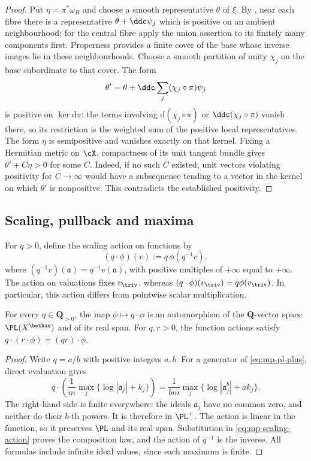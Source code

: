 \begin{proof}
Put $\eta=\pi^*\omega_B$ and choose a smooth representative
$\theta$ of $\xi$.  By \cite[Proposition~3.3(i)--(ii)]{DP04}, near
each fibre there is a representative $\theta+\ddc\psi_j$ which is positive on an
ambient neighbourhood; for the central fibre apply the union assertion
to its finitely many components first.  Properness provides a finite
cover of the base whose inverse images lie in these neighbourhoods.
Choose a smooth partition of unity $\chi_j$ on the base subordinate to
that cover.  The form
\[
 \theta'=\theta+\ddc\sum_j(\chi_j\circ\pi)\psi_j
\]
is positive on $\ker\mathrm{d}\pi$: the terms involving
$\mathrm{d}(\chi_j\circ\pi)$ or $\ddc(\chi_j\circ\pi)$ vanish there,
so its restriction is the weighted sum of the positive local representatives.  The form $\eta$ is semipositive
and vanishes exactly on that kernel.  Fixing a Hermitian metric on
$\cX$, compactness of its unit tangent bundle gives $\theta'+C\eta>0$ for some $C$.  Indeed, if no
such $C$ existed, unit vectors violating positivity for $C\to\infty$
would have a subsequence tending to a vector in the kernel on which
$\theta'$ is nonpositive.  This contradicts the established positivity.
\end{proof}

\subsection{Scaling, pullback and maxima}
\label{subsec:mp-psh-scaling}

For $q>0$, define the scaling action on functions by
\[
             (q\cdot\phi)(v):=q\,\phi(q^{-1}v),
\tag{60.5a}\label{eq:mp-scaling-action}
\]
where $(q^{-1}v)(\mathfrak a)=q^{-1}v(\mathfrak a)$,
with positive multiples of $+\infty$ equal to $+\infty$.
The action on valuations fixes $v_{\triv}$, whereas
$(q\cdot\phi)(v_{\triv})=q\phi(v_{\triv})$.
In particular, this action differs from pointwise scalar multiplication.

\begin{lemma}\label{lem:mp-rational-scaling-pl}
For every $q\in\mathbf Q_{>0}$, the map
$\phi\mapsto q\cdot\phi$ is an automorphism of the
$\mathbf Q$-vector space $\PL(X^{\bethan})$ and of its real span.
For $q,r>0$, the function actions satisfy
$q\cdot(r\cdot\phi)=(qr)\cdot\phi$.
\end{lemma}

\begin{proof}
Write $q=a/b$ with positive integers $a,b$.
For a generator of \eqref{eq:mp-pl-plus}, direct evaluation gives
\[
 q\cdot\left(\frac1m\max_j\{\log|\mathfrak a_j|+k_j\}\right)
   =\frac1{bm}\max_j\{\log|\mathfrak a_j^b|+ak_j\}.
\tag{60.5b}\label{eq:mp-rational-scaling-generators}
\]
The right-hand side is finite everywhere: the ideals
$\mathfrak a_j$ have no common zero, and neither do their
$b$-th powers. It is therefore in $\PL^+$.
The action is linear in the function, so it preserves $\PL$
and its real span. Substitution in \eqref{eq:mp-scaling-action}
proves the composition law, and the action of $q^{-1}$ is the inverse.
All formulas include infinite ideal values, since each maximum is finite.
\end{proof}


